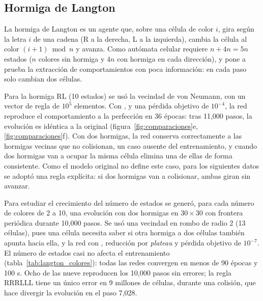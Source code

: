 \subsection{Hormiga de Langton}

La hormiga de Langton es un agente que, sobre una célula de color $i$, gira según la letra $i$ de una cadena (R a la derecha, L a la izquierda), cambia la célula al color $(i+1) \bmod n$ y avanza. Como autómata celular requiere $n + 4n = 5n$ estados ($n$ colores sin hormiga y $4n$ con hormiga en cada dirección), y pone a prueba la extracción de comportamientos con poca información: en cada paso solo cambian dos células.

Para la hormiga RL (10 estados) se usó la vecindad de von Neumann, con un vector de regla de $10^5$ elementos. Con , \onehot{} y una pérdida objetivo de $10^{-4}$, la red reproduce el comportamiento a la perfección en 36 épocas: tras 11,000 pasos, la evolución es idéntica a la original (figura~\ref{fig:comparaciones}e, \ref{fig:comparaciones}f). Con dos hormigas, la red conserva correctamente a las hormigas vecinas que no colisionan, un caso ausente del entrenamiento, y cuando dos hormigas van a ocupar la misma célula elimina una de ellas de forma consistente. Como el modelo original no define este caso, para los siguientes datos se adoptó una regla explícita: si dos hormigas van a colisionar, ambas giran sin avanzar.

Para estudiar el crecimiento del número de estados se generó, para cada número de colores de 2 a 10, una evolución con dos hormigas en $30\times30$ con frontera periódica durante 10,000 pasos. Se usó una vecindad en rombo de radio 2 (13 células), pues una célula necesita saber si otra hormiga a dos células también apunta hacia ella, y la red  con \onehot{}, reducción por \textit{plateau} y pérdida objetivo de $10^{-7}$. El número de estados casi no afecta el entrenamiento (tabla~\ref{tab:langton_colores}): todas las redes convergen en menos de 90 épocas y 100 s. Ocho de las nueve reproducen los 10,000 pasos sin errores; la regla RRRLLL tiene un único error en 9 millones de células, durante una colisión, que hace divergir la evolución en el paso 7,028.

